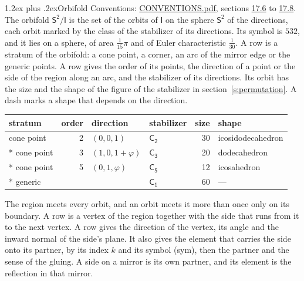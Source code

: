 \documentclass[10pt,a4paper]{article}
\makeatletter
\renewcommand\section{\@startsection{section}{1}{\z@}{-3ex plus -1ex minus -.2ex}%
  {1.2ex plus .2ex}{\normalfont\large\sffamily\bfseries\color{parttitle}}}
\numberwithin{equation}{section}
\newcommand{\grp}[1]{\mathsf{#1}}
\newcommand{\orbname}[1]{#1}
\newcommand{\dirvec}[3]{(#1, #2, #3)}
\newcommand{\goldenratio}{\varphi}
\newcommand{\twosphere}{\mathsf{S}^{2}}
\makeatother
\begin{document}
\section{Orbifold}\label{s:orbifold}
Conventions: \href{../../CONVENTIONS.pdf}{CONVENTIONS.pdf}, sections \href{../../CONVENTIONS.pdf\#conv.17.6}{17.6} to \href{../../CONVENTIONS.pdf\#conv.17.8}{17.8}.
The orbifold $\twosphere/\grp{I}$ is the set of the orbits of $\grp{I}$ on the sphere $\twosphere$ of the directions, each orbit marked by the class of the stabilizer of its directions. Its symbol is $\orbname{532}$, and it lies on a sphere, of area $\tfrac{1}{15}\pi$ and of Euler characteristic $\tfrac{1}{30}$.
\leavevmode\label{n:head.stratum}\label{n:head.order.point}\label{n:head.direction}\label{n:head.stabilizer}\label{n:head.size.orbit}\label{n:head.shape}A row is a stratum of the orbifold: a cone point, a corner, an arc of the mirror edge or the generic points. A row gives the order of its points, the direction of a point or the side of the region along an arc, and the stabilizer of its directions. Its orbit has the size and the shape of the figure of the stabilizer in section~\ref{s:permutation}. A dash marks a shape that depends on the direction.
{\small\setlength{\tabcolsep}{4pt}\begin{longtable}{@{}lrllrl@{}}\toprule
stratum & order & direction & stabilizer & size & shape\\\midrule\endhead
\bottomrule\endfoot\endlastfoot
cone point & 2 & $\dirvec{0}{0}{1}$ & \href{C2.pdf}{$\grp{C_{2}}$} & 30 & icosidodecahedron\\*
cone point & 3 & $\dirvec{1}{0}{1 + \goldenratio{}}$ & \href{C3.pdf}{$\grp{C_{3}}$} & 20 & dodecahedron\\*
cone point & 5 & $\dirvec{0}{1}{\goldenratio{}}$ & \href{C5.pdf}{$\grp{C_{5}}$} & 12 & icosahedron\\*
generic &  &  & \href{C1.pdf}{$\grp{C_{1}}$} & 60 & ---\\
\bottomrule\end{longtable}}
\leavevmode\label{n:head.vertex.region}\label{n:head.angle}\label{n:head.normal.side}\label{n:head.partner}\label{n:head.sense}The region meets every orbit, and an orbit meets it more than once only on its boundary. A row is a vertex of the region together with the side that runs from it to the next vertex. A row gives the direction of the vertex, its angle and the inward normal of the side's plane. It also gives the element that carries the side onto its partner, by its index $k$ and its symbol (sym), then the partner and the sense of the gluing. A side on a mirror is its own partner, and its element is the reflection in that mirror.
\end{document}
